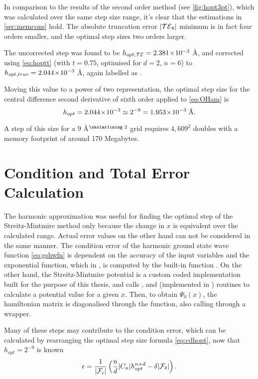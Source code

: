 In comparison to the results of the second order method (see \cref{fig:hopt3pt}), which was calculated over the same step size range, it's clear that the estimations in \cref{sec:memcons} hold.
The absolute truncation error $\lvert\mathcal{TE}_6\rvert$ minimum is in fact four orders smaller, and the optimal step sizes two orders larger.

The uncorrected step  was found to be $h_{opt,\mathcal{TE}} = 2.381\!\times\!10^{-3}$ Å, and corrected using \cref{eq:hoptt} (with $t=0.75$, optimised for $d=2$, $n=6$) to $h_{opt,true} = 2.044\!\times\!10^{-3}$ Å, again labelled as .

Moving this value to a power of two representation, the optimal step size for the central difference second derivative of sixth order applied to \cref{eq:OHam} is
\begin{equation}
h_{opt} = 2.044\!\times\!10^{-3} \simeq 2^{-9} = 1.953\!\times\!10^{-3}\;\text{Å}.
\end{equation}

A step of this size for a $9$ Å$^\text{\skolarlining 2}$ grid requires $4,609^2$ doubles with a memory footprint of around 170 Megabytes.

\section[Condition and Total Error]{Condition and Total Error Calculation}\label{sec:catoterr}

The harmonic approximation was useful for finding the optimal step of the Streitz-Mintmire method only because the change in $x$ is equivalent over the calculated range.
Actual error values on the other hand can not be considered in the same manner.
The condition error of the harmonic ground state wave function \cref{eq:gshwfn} is dependent on the accuracy of the input variables and the exponential function, which in , is computed by the built-in function .
On the other hand, the Streitz-Mintmire potential is a custom coded implementation built for the purpose of this thesis, and calls ,  and  (implemented in ) routines to calculate a potential value for a given $x$.
Then, to obtain $\Psi_0(x)$, the hamiltonian matrix is diagonalised through the  function, also calling  through a  wrapper.

Many of these steps may contribute to the condition error, which can be calculated by rearranging the optimal step size formula \cref{eq:cdhopt}, now that $h_{opt} = 2^{-9}$ is known
\begin{equation}
\epsilon = \frac{1}{\lvert\mathcal{F}_\epsilon\rvert}\left(\frac{n}{d}\lvert C_n\rvert h_{opt}^{n+d}-\delta\lvert\mathcal{F}_\delta\rvert\right).
\end{equation}

